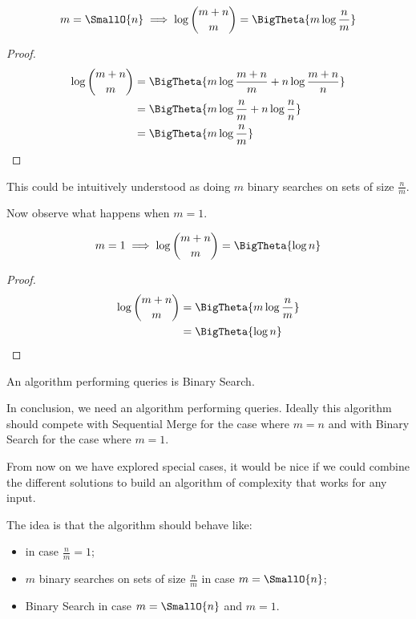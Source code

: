 \begin{lemma}
\begin{align*}
m = \SmallO{n} &\implies \log\binom{m+n}{m} = \BigTheta{m \log\frac{n}{m}}\\
\end{align*}
\end{lemma}

\begin{proof}
\begin{align*}
\log\binom{m+n}{m} &= \BigTheta{m \log\frac{m+n}{m} + n \log\frac{m+n}{n}}\\
&= \BigTheta{m \log\frac{n}{m} + n \log\frac{n}{n}}\\
&= \BigTheta{m \log\frac{n}{m}}\\
\end{align*}
\end{proof}


This could be intuitively understood as doing $m$ binary searches on sets of
size $\frac{n}{m}$.


Now observe what happens when $m = 1$.

\begin{lemma}
\begin{align*}
m = 1 &\implies \log\binom{m+n}{m} = \BigTheta{\log n}\\
\end{align*}
\end{lemma}

\begin{proof}
\begin{align*}
\log\binom{m+n}{m} &= \BigTheta{m \log\frac{n}{m}}\\
&= \BigTheta{\log n}\\
\end{align*}
\end{proof}

An algorithm performing  queries is Binary Search.


In conclusion, we need an algorithm performing  queries.
Ideally this algorithm should compete with Sequential Merge for the case where
$m = n$ and with Binary Search for the case where $m = 1$.


From now on we have explored special cases, it would be nice if we could
combine the different solutions to build an algorithm of complexity  that works for any input.

The idea is that the algorithm should behave like:

\begin{itemize}
\item \tapemerge in case $\frac{n}{m} = 1$;
\item $m$ binary searches on sets of size $\frac{n}{m}$ in case $m = \SmallO{n}$;
\item Binary Search in case \(m = \SmallO{n}\) and \(m = 1\).
\end{itemize}

